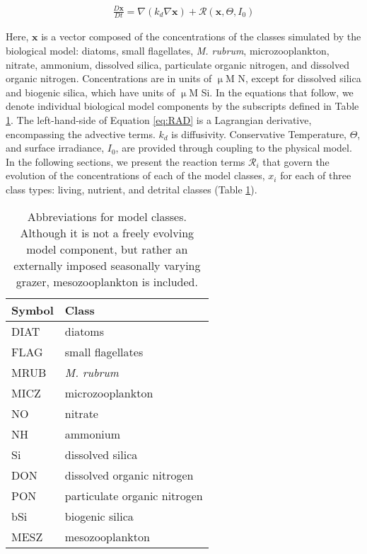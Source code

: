 \documentclass[draft,jgrga]{agutexSI2019}
\begin{document}
\begin{article}
\begin{align}
 \frac{D\mathbf{x}}{Dt}= \nabla \left(k_d \nabla \mathbf{x} \right) + \mathcal{R}(\mathbf{x},\Theta,I_0)
\label{eq:RAD}
\end{align}

Here, $\mathbf{x}$ is a vector composed of the concentrations of the classes simulated by the biological model: diatoms, small flagellates, \textit{M. rubrum}, microzooplankton, nitrate, ammonium, dissolved silica, particulate organic nitrogen, and dissolved organic nitrogen. 
Concentrations are in units of $\upmu$M N, except for dissolved silica and biogenic silica, which have units of $\upmu$M Si. 
In the equations that follow, we denote individual biological model components by the subscripts defined in Table \ref{tbl:symbols}. 
The left-hand-side of Equation \ref{eq:RAD} is a Lagrangian derivative, encompassing the advective terms. 
$k_d$ is diffusivity. 
Conservative Temperature, $\Theta$, and surface irradiance, $I_0$, 
are provided through coupling to the physical model. 
In the following sections, we present the reaction terms $\mathcal{R}_i$ that govern the evolution of the concentrations of each of the model classes, $x_i$ for each of three class types: living, nutrient, and detrital classes (Table \ref{tbl:symbols}).

\begin{table}[htp]
  \caption{Abbreviations for model classes. 
            Although it is not a freely evolving model component, 
            but rather an externally imposed seasonally varying grazer, 
            mesozooplankton is included.} 
  \label{tbl:symbols}
  \begin{spacing}{0.4} \small
   \centering
   \begin{tabular}{ll}\toprule
    Symbol & Class \\ \midrule
      DIAT & diatoms \\
      FLAG & small flagellates \\
      MRUB & \textit{M. rubrum} \\
      MICZ & microzooplankton \\
      NO   & nitrate \\
      NH   & ammonium \\
      Si   & dissolved silica \\
      DON  & dissolved organic nitrogen \\
      PON  & particulate organic nitrogen \\
      bSi  & biogenic silica \\ 
      MESZ & mesozooplankton \\ 
   \midrule 
  \end{tabular}
  \end{spacing}
\end{table}


\end{article}
\end{document}
